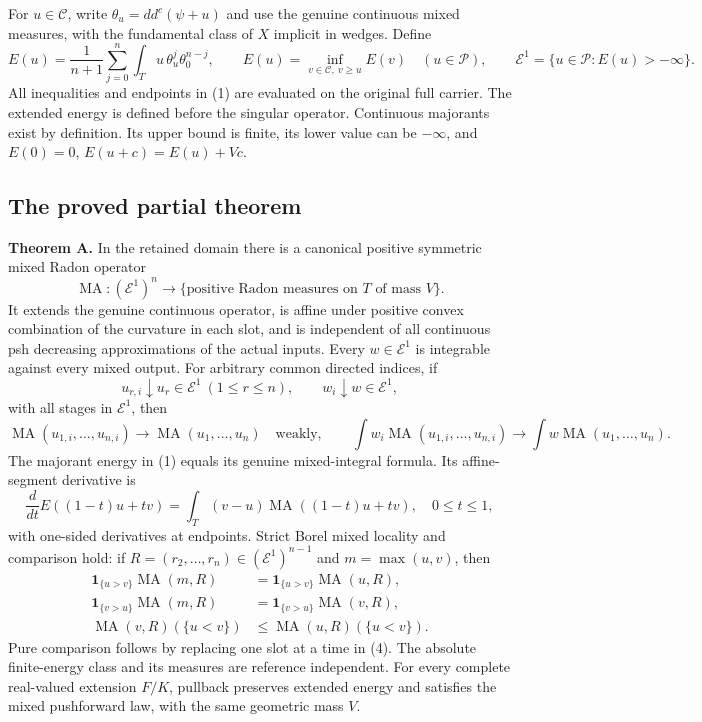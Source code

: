 \documentclass[
]{article}
\begin{document}
For \(u\in\mathcal C\), write \(\theta_u=dd^c(\psi+u)\) and use the
genuine continuous mixed measures, with the fundamental class of \(X\)
implicit in wedges. Define \[
E(u)=\frac1{n+1}\sum_{j=0}^n\int_Tu\,\theta_u^j\theta_0^{n-j},
\qquad
E(u)=\inf_{v\in\mathcal C,\ v\geq u}E(v)\quad(u\in\mathcal P),
\qquad
\mathcal E^1=\{u\in\mathcal P:E(u)>-\infty\}.
\tag{1}
\] All inequalities and endpoints in (1) are evaluated on the original
full carrier. The extended energy is defined before the singular
operator. Continuous majorants exist by definition. Its upper bound is
finite, its lower value can be \(-\infty\), and \(E(0)=0\),
\(E(u+c)=E(u)+Vc\).

\subsection{The proved partial
theorem}\label{the-proved-partial-theorem}

\textbf{Theorem A.} In the retained domain there is a canonical positive
symmetric mixed Radon operator \[
\operatorname{MA}:(\mathcal E^1)^n\longrightarrow\{\text{positive Radon measures on }T\text{ of mass }V\}.
\] It extends the genuine continuous operator, is affine under positive
convex combination of the curvature in each slot, and is independent of
all continuous psh decreasing approximations of the actual inputs. Every
\(w\in\mathcal E^1\) is integrable against every mixed output. For
arbitrary common directed indices, if \[
u_{r,i}\downarrow u_r\in\mathcal E^1\ (1\leq r\leq n),\qquad
w_i\downarrow w\in\mathcal E^1,
\] with all stages in \(\mathcal E^1\), then \[
\operatorname{MA}(u_{1,i},\ldots,u_{n,i})\longrightarrow\operatorname{MA}(u_1,\ldots,u_n)
\quad\text{weakly},
\qquad
\int w_i\operatorname{MA}(u_{1,i},\ldots,u_{n,i})\longrightarrow\int w\operatorname{MA}(u_1,\ldots,u_n).
\tag{2}
\] The majorant energy in (1) equals its genuine mixed-integral formula.
Its affine-segment derivative is \[
\frac d{dt}E((1-t)u+tv)=\int_T(v-u)\operatorname{MA}((1-t)u+tv),\quad 0\leq t\leq1,
\tag{3}
\] with one-sided derivatives at endpoints. Strict Borel mixed locality
and comparison hold: if \(R=(r_2,\ldots,r_n)\in(\mathcal E^1)^{n-1}\)
and \(m=\max(u,v)\), then \[
\begin{split}
\mathbf1_{\{u>v\}}\operatorname{MA}(m,R)&=\mathbf1_{\{u>v\}}\operatorname{MA}(u,R),\\
\mathbf1_{\{v>u\}}\operatorname{MA}(m,R)&=\mathbf1_{\{v>u\}}\operatorname{MA}(v,R),\\
\operatorname{MA}(v,R)(\{u<v\})&\leq\operatorname{MA}(u,R)(\{u<v\}).
\end{split}\tag{4}
\] Pure comparison follows by replacing one slot at a time in (4). The
absolute finite-energy class and its measures are reference independent.
For every complete real-valued extension \(F/K\), pullback preserves
extended energy and satisfies the mixed pushforward law, with the same
geometric mass \(V\).
\end{document}

